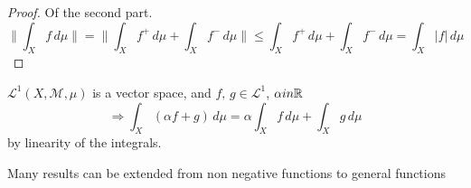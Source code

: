 \begin{proof}
    Of the second part.
    \[
        \| \int_X f \, d\mu \| = \| \int_X f^+ \, d\mu + \int_X f^- \, d\mu\| \leq \int_X f^+ \, d\mu + \int_X f^- \, d\mu = \int_X |f| \, d\mu  
    \]
\end{proof}

\begin{proposition}
    \(\mathcal{L}^1(X, \mathcal{M}, \mu)\) is a vector space, and \(f, \, g \in \mathcal{L}^1\), \(\alpha in \mathbb{R}\)
    \[
        \Rightarrow \int_X \left(\alpha f + g \right) \, d\mu = \alpha \int_X f \, d\mu + \int_X g \, d\mu 
    \]  
    by linearity of the integrals.
\end{proposition}

Many results can be extended from non negative functions to general functions

